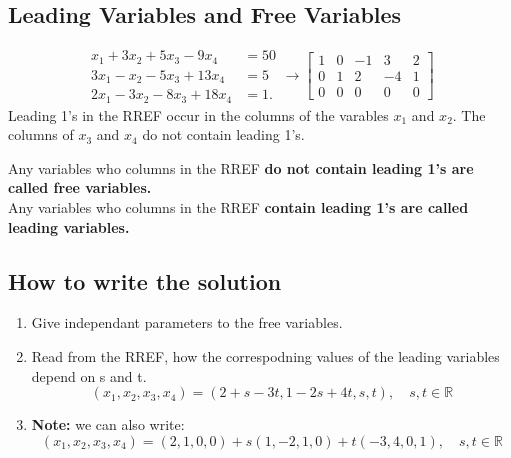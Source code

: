 \documentclass[12pt]{article}
\theoremstyle{definition}
\theoremstyle{plain}
\begin{document}
\subsection{Leading Variables and Free Variables}
\[
\begin{align*}
  x_1 + 3x_2 + 5x_3 - 9x_4 &= 50\\
  3x_1 - x_2 - 5x_3 + 13x_4 &= 5\\
  2x_1 - 3x_2 - 8x_3 + 18x_4 &= 1.
\end{align*}
\rightarrow
\left[
\begin{array}{cccc|c}
  1 & 0 & -1 & 3 & 2 \\
  0 & 1 & 2 & -4 & 1 \\
  0 & 0 & 0 & 0 & 0
\end{array}
\right]
\]
\noindent Leading 1's in the RREF occur in the columns of the varables $x_1$ and $x_2$. The columns of $x_3$ and $x_4$ do not contain leading 1's. 

\begin{definitionbox}
  Any variables who {columns} in the RREF \textbf{do not contain leading 1's are called free variables.} \\
  Any variables who columns in the RREF \textbf{contain leading 1's are called leading variables.}
\end{definitionbox}

\subsection{How to write the solution}
\begin{enumerate}
  \item Give independant parameters to the free variables.
  \item Read from the RREF, how the correspodning values of the leading variables depend on s and t. $$(x_1, x_2, x_3, x_4) = (2+s - 3t, 1-2s+ 4t, s, t), \quad s,t \in \mathbb{R}$$
  \item \textbf{Note:} we can also write: $$(x_1, x_2, x_3, x_4) = (2,1,0,0) + s(1,-2,1,0) + t(-3, 4, 0, 1), \quad s,t \in \mathbb{R}$$
\end{enumerate}
\end{document}
